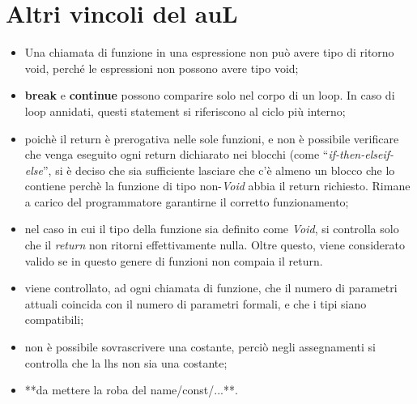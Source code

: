 \documentclass{article}
\begin{document}
\section{Altri vincoli del auL}
\begin{itemize}
	\item Una chiamata di funzione in una espressione non può avere tipo di
		ritorno void, perché le espressioni non possono avere tipo void;
	
	\item \textbf{break} e \textbf{continue} possono comparire solo nel corpo di un loop.
		In caso di loop annidati, questi statement si riferiscono al ciclo più interno;
	
	\item poichè il return è prerogativa nelle sole funzioni, e non è possibile verificare che
		venga eseguito ogni return dichiarato nei blocchi (come ``\textit{if-then-elseif-else}'',
		si è deciso che sia sufficiente lasciare che c'è almeno un blocco che lo contiene perchè
		la funzione di tipo non-\textit{Void} abbia il return richiesto. Rimane a carico del programmatore
		garantirne il corretto funzionamento;

	\item nel caso in cui il tipo della funzione sia definito come \textit{Void}, si controlla solo che
		il \textit{return} non ritorni effettivamente nulla. Oltre questo, viene considerato valido se
		in questo genere di funzioni non compaia il return.
	
	\item viene controllato, ad ogni chiamata di funzione, che il numero di parametri
		attuali coincida con il numero di parametri formali, e che i tipi
		siano compatibili;
		
	\item non è possibile sovrascrivere una costante, perciò negli assegnamenti
		si controlla che la lhs non sia una costante;
	
	\item **da mettere la roba del name/const/...**.
\end{itemize}
\end{document}
